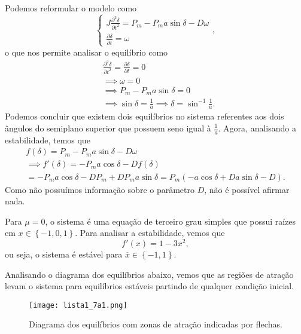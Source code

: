 \documentclass[a4paper]{report}
\begin{document}


Podemos reformular o modelo como \[
\begin{cases}
    J \frac{\partial^2 \delta}{\partial t^2} = P_m -P_ma \sin\delta -D\omega \\
    \frac{\partial \delta}{\partial t} = \omega
\end{cases}
,\] o que nos permite analisar o equilíbrio como
\begin{align*}
    & \frac{\partial^2 \delta}{\partial t^2} = \frac{\partial \delta}{\partial t} = 0 \\
    & \implies \omega = 0 \\
    & \implies P_m -P_ma \sin\delta = 0 \\
    & \implies \sin\delta = \frac{1}{a} \implies \delta=\sin^{-1}\frac{1}{a}
.\end{align*}
Podemos concluir que existem dois equilíbrios no sistema referentes aos dois ângulos do semiplano superior que possuem seno igual à $\frac{1}{a}$. Agora, analisando a estabilidade, temos que 
\begin{align*}
    f\left( \delta\right) = P_m -P_ma \sin\delta -D\omega \\
    \implies f'\left( \delta \right) = -P_ma\cos\delta -Df(\delta) \\
    = -P_ma\cos\delta -DP_m +DP_ma\sin\delta = P_m\left( -a\cos\delta +Da\sin\delta -D \right) 
.\end{align*}
Como não possuímos informação sobre o parâmetro $D$, não é possível afirmar nada.



Para $\mu=0$, o sistema é uma equação de terceiro grau simples que possui raízes em $x \in \left\{ -1, 0, 1 \right\} $. Para analisar a estabilidade, vemos que \[
    f'(x) = 1-3x^2
,\] ou seja, o sistema é estável para $\overline{x} \in  \left\{ -1, 1 \right\} $.


Analisando o diagrama dos equilíbrios abaixo, vemos que as regiões de atração levam o sistema para equilíbrios estáveis partindo de qualquer condição inicial.

\begin{figure}[H]
    \centering
    \texttt{[image: lista1\_7a1.png]}
    \caption{Diagrama dos equilíbrios com zonas de atração indicadas por flechas.}
    \label{fig:lista1_7a1-png}
\end{figure}
\end{document}
